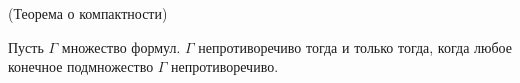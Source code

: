 
(Теорема о компактности)

Пусть $\Gamma$ множество формул. $\Gamma$ непротиворечиво тогда и только тогда,
когда любое конечное подмножество $\Gamma$ непротиворечиво.